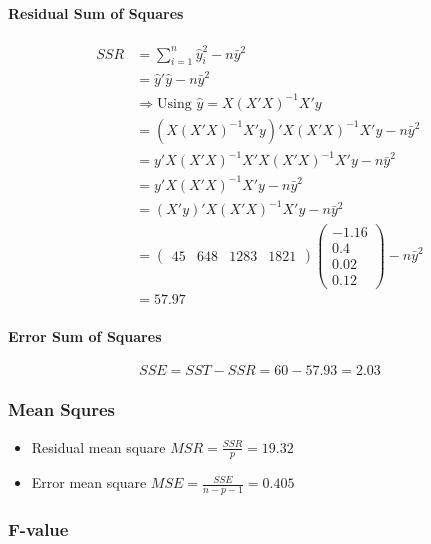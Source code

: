 \documentclass[]{article}
\providecommand{\tightlist}{%
  \setlength{\itemsep}{0pt}\setlength{\parskip}{0pt}}
\let\oldparagraph\paragraph
\renewcommand{\paragraph}[1]{\oldparagraph{#1}\mbox{}}
\begin{document}
\paragraph{Residual Sum of Squares}\label{residual-sum-of-squares}

\[
\begin{aligned}
SSR &= \sum_{i = 1}^n \hat{y}_i^2 - n\bar{y}^2\\
&= \hat{y}'\hat{y} - n\bar{y}^2\\
&\Rightarrow \text{Using $\hat{y} = X(X'X)^{-1}X'y$} \\
&=(X(X'X)^{-1}X'y)'X(X'X)^{-1}X'y - n\bar{y}^2\\
&=y'X(X'X)^{-1}X'X(X'X)^{-1}X'y - n\bar{y}^2\\
&=y'X(X'X)^{-1}X'y - n\bar{y}^2\\
&=(X'y)'X(X'X)^{-1}X'y - n\bar{y}^2\\
&=
\begin{pmatrix} 45 & 648 & 1283 & 1821 \end{pmatrix}
\begin{pmatrix} -1.16 \\  0.4 \\  0.02 \\  0.12  \end{pmatrix}  - n\bar{y}^2 \\
&= 57.97
\end{aligned}
\]

\paragraph{Error Sum of Squares}\label{error-sum-of-squares}

\[
SSE = SST - SSR = 60 - 57.93 = 2.03
\]

\subsubsection{Mean Squres}\label{mean-squres}

\begin{itemize}
\tightlist
\item
  Residual mean square \(MSR = \frac{SSR}{p} = 19.32\)
\item
  Error mean square \(MSE = \frac{SSE}{n-p-1} = 0.405\)
\end{itemize}

\subsubsection{F-value}\label{f-value}
\end{document}

